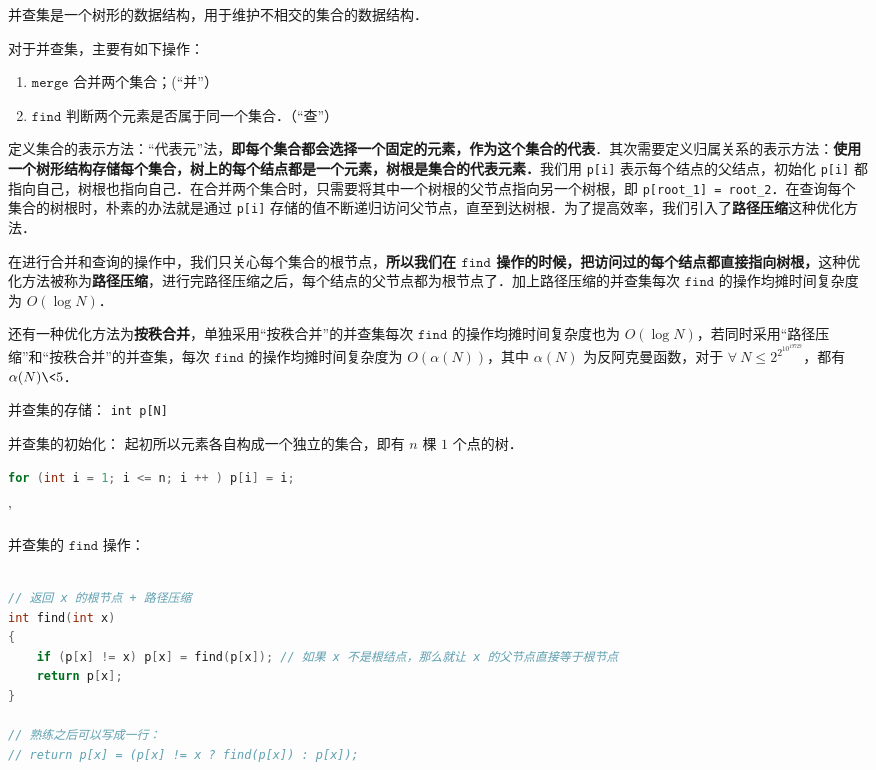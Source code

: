 
并查集是一个树形的数据结构，用于维护不相交的集合的数据结构．

对于并查集，主要有如下操作：
\begin{enumerate}
\item $\mathtt{merge}$ 合并两个集合；(“并”）

\item $\mathtt{find}$ 判断两个元素是否属于同一个集合．（“查”）
\end{enumerate}

定义集合的表示方法：“代表元”法，\textbf{即每个集合都会选择一个固定的元素，作为这个集合的代表}．其次需要定义归属关系的表示方法：\textbf{使用一个树形结构存储每个集合，树上的每个结点都是一个元素，树根是集合的代表元素．}我们用 \verb|p[i]| 表示每个结点的父结点，初始化 \verb|p[i]| 都指向自己，树根也指向自己．在合并两个集合时，只需要将其中一个树根的父节点指向另一个树根，即 \verb|p[root_1] = root_2|．在查询每个集合的树根时，朴素的办法就是通过 \verb|p[i]| 存储的值不断递归访问父节点，直至到达树根．为了提高效率，我们引入了\textbf{路径压缩}这种优化方法．

在进行合并和查询的操作中，我们只关心每个集合的根节点，\textbf{所以我们在 $\mathtt{find}$ 操作的时候，把访问过的每个结点都直接指向树根，}这种优化方法被称为\textbf{路径压缩}，进行完路径压缩之后，每个结点的父节点都为根节点了．加上路径压缩的并查集每次 $\mathtt{find}$ 的操作均摊时间复杂度为 $O(\log N)$．

还有一种优化方法为\textbf{按秩合并}，单独采用“按秩合并”的并查集每次 $\mathtt{find}$ 的操作均摊时间复杂度也为 $O(\log N)$，若同时采用“路径压缩”和“按秩合并”的并查集，每次 $\mathtt{find}$ 的操作均摊时间复杂度为 $O(\alpha(N))$，其中 $\alpha(N)$ 为反阿克曼函数，对于 $\forall \ N \leq 2^{2^{10^{19729}}}$，都有 $\alpha(N) \< 5$．

并查集的存储：
\verb|int p[N]|

并查集的初始化：
起初所以元素各自构成一个独立的集合，即有 $n$ 棵 $1$ 个点的树．
\begin{lstlisting}[language=cpp]
for (int i = 1; i <= n; i ++ ) p[i] = i;
\end{lstlisting}'

并查集的 $\mathtt{find}$ 操作：
\begin{lstlisting}[language=cpp]

// 返回 x 的根节点 + 路径压缩
int find(int x)
{
    if (p[x] != x) p[x] = find(p[x]); // 如果 x 不是根结点，那么就让 x 的父节点直接等于根节点
    return p[x];
}

// 熟练之后可以写成一行：
// return p[x] = (p[x] != x ? find(p[x]) : p[x]);
\end{lstlisting}